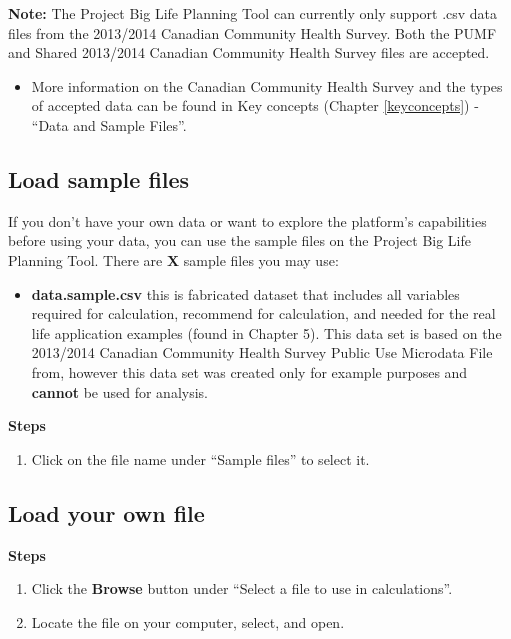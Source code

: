 \documentclass[]{book}
\providecommand{\tightlist}{%
  \setlength{\itemsep}{0pt}\setlength{\parskip}{0pt}}
\begin{document}
\textbf{Note:} The Project Big Life Planning Tool can currently only
support .csv data files from the 2013/2014 Canadian Community Health
Survey. Both the PUMF and Shared 2013/2014 Canadian Community Health
Survey files are accepted.

\begin{itemize}
\tightlist
\item
  More information on the Canadian Community Health Survey and the types
  of accepted data can be found in Key concepts (Chapter
  \ref{keyconcepts}) - ``Data and Sample Files''.
\end{itemize}

\subsection{Load sample files}\label{load-sample-files}

If you don't have your own data or want to explore the platform's
capabilities before using your data, you can use the sample files on the
Project Big Life Planning Tool. There are \textbf{X} sample files you
may use:

\begin{itemize}
\tightlist
\item
  \textbf{data.sample.csv} this is fabricated dataset that includes all
  variables required for calculation, recommend for calculation, and
  needed for the real life application examples (found in Chapter 5).
  This data set is based on the 2013/2014 Canadian Community Health
  Survey Public Use Microdata File from, however this data set was
  created only for example purposes and \textbf{cannot} be used for
  analysis.
\end{itemize}

\textbf{Steps}

\begin{enumerate}
\def\labelenumi{\arabic{enumi}.}
\tightlist
\item
  Click on the file name under ``Sample files'' to select it.
\end{enumerate}

\subsection{Load your own file}\label{load-your-own-file}

\textbf{Steps}

\begin{enumerate}
\def\labelenumi{\arabic{enumi}.}
\item
  Click the \textbf{Browse} button under ``Select a file to use in
  calculations''.
\item
  Locate the file on your computer, select, and open.
\end{enumerate}
\end{document}
